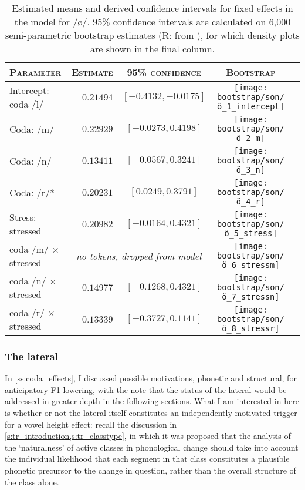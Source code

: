 \begin{table}[H]
  \centering
  \begin{tabular}{lrccc}
    \toprule
    \textsc{Parameter} & \textsc{Estimate} & \textsc{95\% confidence} & \textsc{Bootstrap}\\
    \midrule
    Intercept: coda /l/ & $-0.21494$ & $[-0.4132, -0.0175]$ & \texttt{[image: bootstrap/son/ö\_1\_intercept]}  \\
    Coda: /m/ & $0.22929$ & $[-0.0273, 0.4198]$ & \texttt{[image: bootstrap/son/ö\_2\_m]} \\
    Coda: /n/ & $0.13411$ & $[-0.0567, 0.3241]$ & \texttt{[image: bootstrap/son/ö\_3\_n]} \\
    Coda: /r/* & $0.20231$ & $[0.0249, 0.3791]$ & \texttt{[image: bootstrap/son/ö\_4\_r]}   \\
    \midrule
    Stress: stressed & $0.20982$ & $[-0.0164, 0.4321]$ & \texttt{[image: bootstrap/son/ö\_5\_stress]}   \\
    coda /m/ $\times$ stressed & \multicolumn{2}{c}{\emph{no tokens, dropped from model}} & \texttt{[image: bootstrap/son/ö\_6\_stressm]} \\
    coda /n/ $\times$ stressed & $0.14977$ & $[-0.1268, 0.4321]$ & \texttt{[image: bootstrap/son/ö\_7\_stressn]} \\
    coda /r/ $\times$ stressed & $-0.13339$ & $[-0.3727, 0.1141]$ & \texttt{[image: bootstrap/son/ö\_8\_stressr]}   \\
    \bottomrule
  \end{tabular}
  \caption[, /\o/]{Estimated means and derived confidence intervals for fixed effects in the model  for /\o/. 95\% confidence intervals are calculated on 6,000 semi-parametric bootstrap estimates (R:  from ), for which density plots are shown in the final column. }
  \label{tab:tr_lme_ö_coda}
\end{table}

\subsubsection{The lateral}\label{sss:lateral}

In \cref{ss:coda_effects}, I discussed possible motivations, phonetic and structural, for anticipatory F1-lowering, with the note that the status of the lateral would be addressed in greater depth in the following sections. What I am interested in here is whether or not the lateral itself constitutes an independently-motivated trigger for a vowel height effect: recall the discussion in \cref{s:tr_introduction,s:tr_classtype}, in which it was proposed that the analysis of the `naturalness' of active classes in phonological change should take into account the individual likelihood that each segment in that class constitutes a plausible phonetic precursor to the change in question, rather than the overall structure of the class alone.

